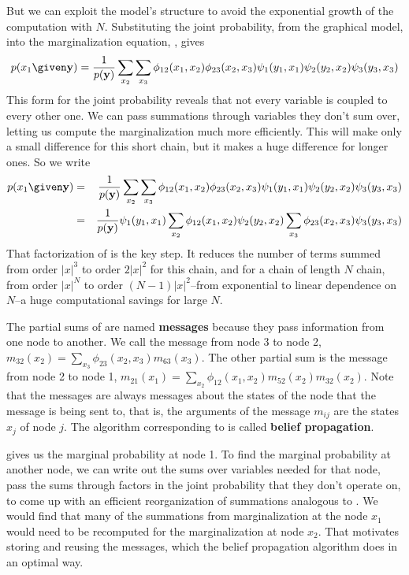 But we can exploit the model's structure to avoid the
exponential growth of the computation with $N$.
Substituting the joint probability, from the graphical model, into the
marginalization equation, \eqn{\ref{eq:3chain}}, gives
\begin{equation}
p(x_1 \given \mathbf{y}) = 
\frac{1}{p(\mathbf{y})} \sum_{x_2} \sum_{x_3}  
\phi_{12}(x_1, x_2)  \phi_{23}(x_2, x_3) \psi_{1}(y_1, x_1) \psi_{2}(y_2, x_2) \psi_{3}(y_3, x_3) 
\label{eq:3chainb}
\end{equation}
This form for the joint probability reveals that not every variable is
coupled to every other one.  We can pass summations
through  variables they don't sum over, letting us compute the
marginalization much more efficiently.  This will make only a small
difference for this short chain, but it makes a huge difference
for longer ones.  So we write
\begin{eqnarray}
p(x_1 \given \mathbf{y}) 
& = & 
\frac{1}{p(\mathbf{y})} \sum_{x_2} \sum_{x_3}  
\phi_{12}(x_1, x_2)  \phi_{23}(x_2, x_3)
\psi_{1}(y_1, x_1) \psi_{2}(y_2, x_2) \psi_{3}(y_3, x_3)  
\label{eq:before}
\\
& = &
\frac{1}{p(\mathbf{y})}
\psi_{1}(y_1, x_1) 
\sum_{x_2} \phi_{12}(x_1, x_2) \psi_{2}(y_2, x_2) 
\sum_{x_3}   \phi_{23}(x_2, x_3)  \psi_{3}(y_3, x_3)  
\label{eq:after} 
\end{eqnarray}
That factorization of \eqn{\ref{eq:after}} is the key step.
It reduces the number of terms summed from order $\left| x \right| ^3$ to order $2
\left| x \right|^2$ for this chain, and for a chain of length $N$ chain, from order $\left|x \right|^N$ to order $(N-1) \left|x \right|^2$--from exponential to linear dependence on $N$--a
huge computational savings for large $N$.  

The partial sums of \eqn{\ref{eq:after}} are named  {\bf messages} 
because they pass information from one node to another.  We call the message from node 3
to node 2, $m_{32}(x_2)  = \sum_{x_3}   \phi_{23}(x_2, x_3)
m_{63}(x_3) $.  The other partial sum is the message from node 2 to
node 1, 
$m_{21}(x_1)   = \sum_{x_2} \phi_{12}(x_1, x_2)  m_{52}(x_2)  
m_{32}(x_2) $.
Note that the messages are always messages about
the states of the node that the message is being sent to, that is, the
arguments of the message $m_{ij}$ are the states $x_j$ of node $j$.  The algorithm corresponding to \eqn{\ref{eq:after}} is called {\bf belief propagation}.

\Eqn{\ref{eq:after}} gives us the marginal probability at node 1.  To
find the marginal probability at another node, we 
can write out the sums over variables needed for that node, pass the
sums through factors in the joint probability that they don't operate
on, to come up with an efficient reorganization of summations analogous to
\eqn{\ref{eq:after}}.  We would find that many
of the summations from marginalization at the node $x_1$  would need
to be recomputed for the marginalization at node $x_2$.  That
motivates storing and reusing the messages, which the belief propagation algorithm does in an optimal way.

